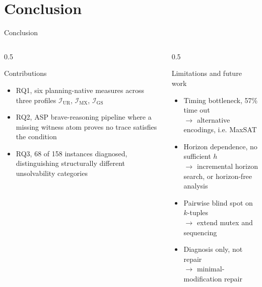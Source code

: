 \section{Conclusion}

\begin{frame}{Conclusion}
    \begin{columns}[t]
        \begin{column}{0.5\textwidth}
            \begin{block}{Contributions}
                \begin{itemize}
                    \item RQ1, six planning-native measures across three profiles $\mathcal{I}_{\text{UR}}$, $\mathcal{I}_{\text{MX}}$, $\mathcal{I}_{\text{GS}}$
                    \item RQ2, ASP brave-reasoning pipeline where a missing witness atom proves no trace satisfies the condition
                    \item RQ3, 68 of 158 instances diagnosed, distinguishing structurally different unsolvability categories
                \end{itemize}
            \end{block}
        \end{column}
        \begin{column}{0.5\textwidth}
            \begin{block}{Limitations and future work}
                \begin{itemize}
                    \item Timing bottleneck, 57\% time out \\ $\to$ alternative encodings, i.e. MaxSAT
                    \item Horizon dependence, no sufficient $h$ \\ $\to$ incremental horizon search, or horizon-free analysis
                    \item Pairwise blind spot on $k$-tuples \\ $\to$ extend mutex and sequencing
                    \item Diagnosis only, not repair \\ $\to$ minimal-modification repair
                \end{itemize}
            \end{block}
        \end{column}
    \end{columns}

    \vfill
\end{frame}
